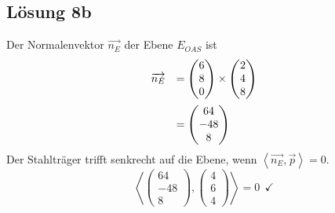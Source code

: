 \subsection{Lösung 8b}
Der Normalenvektor $\displaystyle \overrightarrow{n_{E}}$ der Ebene $\displaystyle E_{OAS}$ ist
\begin{equation*}
	\begin{array}{ c l }
		\overrightarrow{n_{E}} & =\begin{pmatrix}
			6\\
			8\\
			0
		\end{pmatrix} \times \begin{pmatrix}
			2\\
			4\\
			8
		\end{pmatrix}\vspace{2mm}\\
		& =\begin{pmatrix}
			64\\
			-48\\
			8
		\end{pmatrix}
	\end{array}
\end{equation*}
Der Stahlträger trifft senkrecht auf die Ebene, wenn $\displaystyle \left< \overrightarrow{n_{E}} ,\vec{p}\right> =0$.
\begin{equation*}
	\left< \begin{pmatrix}
		64\\
		-48\\
		8
	\end{pmatrix} ,\begin{pmatrix}
		4\\
		6\\
		4
	\end{pmatrix}\right> =0\ \ \checkmark
\end{equation*}